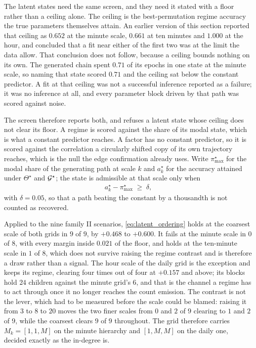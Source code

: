 The latent states need the same screen, and they need it stated with a floor
rather than a ceiling alone. The ceiling is the best-permutation regime accuracy
the true parameters themselves attain. An earlier version of this section
reported that ceiling as \(0.652\) at the minute scale, \(0.661\) at ten minutes
and \(1.000\) at the hour, and concluded that a fit near either of the first two
was at the limit the data allow. That conclusion does not follow, because a
ceiling bounds nothing on its own. The generated chain spent \(0.71\) of its
epochs in one state at the minute scale, so naming that state scored \(0.71\)
and the ceiling sat below the constant predictor. A fit at that ceiling was not
a successful inference reported as a failure; it was no inference at all, and
every parameter block driven by that path was scored against noise.

The screen therefore reports both, and refuses a latent state whose ceiling does
not clear its floor. A regime is scored against the share of its modal state,
which is what a constant predictor reaches. A factor has no constant predictor,
so it is scored against the correlation a circularly shifted copy of its own
trajectory reaches, which is the null the edge confirmation already uses. Write
\(\pi^\star_{\max}\) for the modal share of the generating path at scale \(k\)
and \(a_k^\star\) for the accuracy attained under \(\Theta^\star\) and
\({\mathcal{G}}^\star\); the state is admissible at that scale only when
\begin{align}
a_k^\star - \pi^\star_{\max} \;\ge\; \delta ,
\label{eq:latent_ordering}
\end{align}
with \(\delta = 0.05\), so that a path beating the constant by a thousandth is
not counted as recovered.

Applied to the nine family II scenarios, \eqref{eq:latent_ordering} holds at the
coarsest scale of both grids in \(9\) of \(9\), by \(+0.468\) to \(+0.600\). It
fails at the minute scale in \(0\) of \(8\), with every margin inside \(0.021\)
of the floor, and holds at the ten-minute scale in \(1\) of \(8\), which does not
survive raising the regime contrast and is therefore a draw rather than a signal.
The hour scale of the daily grid is the exception and keeps its regime, clearing
four times out of four at \(+0.157\) and above; its blocks hold \(24\) children
against the minute grid's \(6\), and that is the channel a regime has to act
through once it no longer reaches the count emission. The contrast is not the
lever, which had to be measured before the scale could be blamed: raising it
from \(3\) to \(8\) to \(20\) moves the two finer scales from \(0\) and \(2\) of
\(9\) clearing to \(1\) and \(2\) of \(9\), while the coarsest clears \(9\) of
\(9\) throughout. The grid therefore carries \(M_k = [1, 1, M]\) on the minute
hierarchy and \([1, M, M]\) on the daily one, decided exactly as the in-degree
is.


